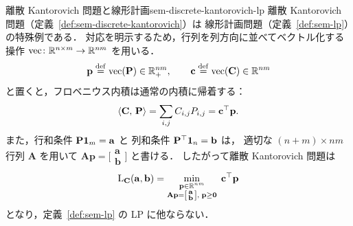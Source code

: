 \begin{remark}{離散 Kantorovich 問題と線形計画}{sem-discrete-kantorovich-lp}
  離散 Kantorovich 問題（定義~\ref{def:sem-discrete-kantorovich}）は
  線形計画問題（定義~\ref{def:sem-lp}）の特殊例である．
  対応を明示するため，行列を列方向に並べてベクトル化する操作
  $\operatorname{vec} \colon \mathbb{R}^{n \times m} \to \mathbb{R}^{nm}$ を用いる．
  \[
    \mathbf{p} \overset{\mathrm{def}}{=} \operatorname{vec}(\mathbf{P}) \in \mathbb{R}^{nm}_+,
    \qquad
    \mathbf{c} \overset{\mathrm{def}}{=} \operatorname{vec}(\mathbf{C}) \in \mathbb{R}^{nm}
  \]
  と置くと，フロベニウス内積は通常の内積に帰着する：
  \[
    \langle \mathbf{C},\, \mathbf{P} \rangle
    = \sum_{i,j} C_{i,j} P_{i,j}
    = \mathbf{c}^\top \mathbf{p}.
  \]
  また，行和条件 $\mathbf{P}\mathbf{1}_m = \mathbf{a}$ と
  列和条件 $\mathbf{P}^\top \mathbf{1}_n = \mathbf{b}$ は，
  適切な $(n{+}m) \times nm$ 行列 $\mathbf{A}$ を用いて
  $\mathbf{A}\mathbf{p} = \bigl[\begin{smallmatrix}\mathbf{a}\\ \mathbf{b}\end{smallmatrix}\bigr]$
  と書ける．
  したがって離散 Kantorovich 問題は
  \[
    \mathrm{L}_{\mathbf{C}}(\mathbf{a}, \mathbf{b})
    = \min_{\substack{\mathbf{p} \in \mathbb{R}^{nm} \\
        \mathbf{A}\mathbf{p}
          = \left[\begin{smallmatrix}\mathbf{a}\\ \mathbf{b}\end{smallmatrix}\right],\;
        \mathbf{p} \geq \mathbf{0}}}\;
    \mathbf{c}^\top \mathbf{p}
  \]
  となり，定義~\ref{def:sem-lp} の LP に他ならない．
\end{remark}

